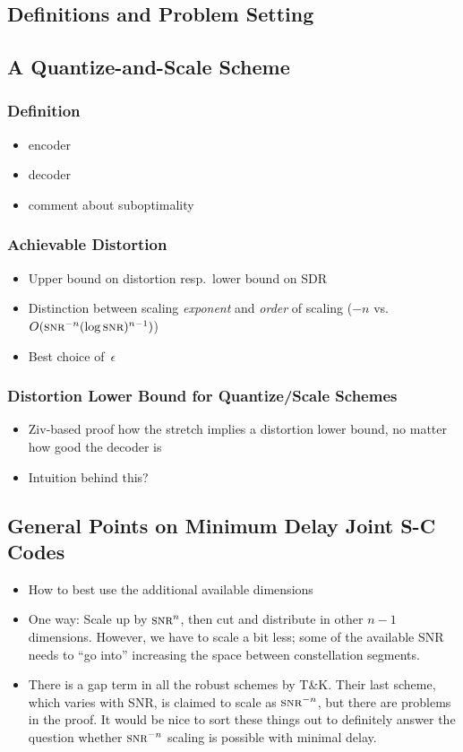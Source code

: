 \documentclass[a4paper]{article}
\theoremstyle{definition}
\newcommand{\abbrev}[1]{\textsc{\MakeLowercase{#1}}}
\newcommand{\snr}{\abbrev{snr}}
\let\e\epsilon
\begin{document}
\subsection{Definitions and Problem Setting}

\subsection{A Quantize-and-Scale Scheme}
\subsubsection{Definition}
\begin{itemize}
  \item encoder
  \item decoder
  \item comment about suboptimality
\end{itemize}
\subsubsection{Achievable Distortion}
\begin{itemize}
  \item Upper bound on distortion resp.\ lower bound on SDR
  \item Distinction between scaling \emph{exponent} and \emph{order} of scaling
    ($-n$ vs.\ $O(\snr^{-n}(\log\snr)^{n-1})$)
  \item Best choice of~$\e$
\end{itemize}
\subsubsection{Distortion Lower Bound for Quantize/Scale Schemes}
\begin{itemize}
  \item Ziv-based proof how the stretch implies a distortion lower bound, no
    matter how good the decoder is
  \item Intuition behind this?
\end{itemize}

\subsection{General Points on Minimum Delay Joint S-C Codes}
\begin{itemize}
  \item How to best use the additional available dimensions
  \item One way: Scale up by $\snr^n$, then cut and distribute in other $n-1$
    dimensions. However, we have to scale a bit less; some of the available SNR
    needs to ``go into'' increasing the space between constellation segments.
  \item There is a gap term in all the robust schemes by T\&K. Their last
    scheme, which varies with SNR, is claimed to scale as $\snr^{-n}$, but there
    are problems in the proof. It would be nice to sort these things out to
    definitely answer the question whether $\snr^{-n}$ scaling is possible with
    minimal delay. 
\end{itemize}
\end{document}
